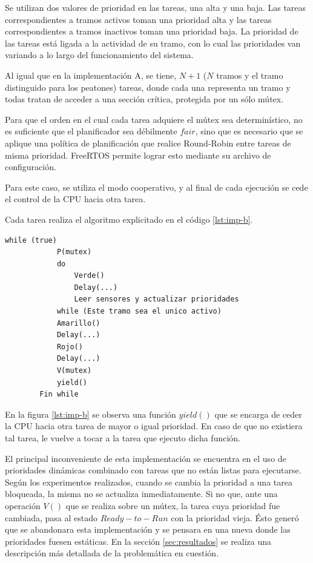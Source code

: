 	Se utilizan dos valores de prioridad en las tareas, una alta y una baja.
	Las tareas correspondientes a tramos activos toman una prioridad alta y las tareas correspondientes a tramos inactivos toman una prioridad baja. 
	La prioridad de las tareas está ligada a la actividad de su tramo, con lo cual las prioridades van variando a lo largo del funcionamiento del sistema.

	Al igual que en la implementación A, se tiene, $N + 1$ ($N$ tramos y el tramo distinguido para los peatones) tareas, donde cada una representa un tramo y todas tratan de acceder a una sección crítica, protegida por un sólo mútex.
	
	Para que el orden en el cual cada tarea adquiere el mútex sea determinístico, no es suficiente que el planificador sea débilmente $fair$, sino que es necesario que se aplique una política de planificación que realice Round-Robin entre tareas de misma prioridad.
	FreeRTOS permite lograr esto mediante su archivo de configuración.

	Para este caso, se utiliza el modo cooperativo, y al final de cada ejecución se cede el control de la CPU hacia otra tarea.

	Cada tarea realiza el algoritmo explicitado en el código \ref{lst:imp-b}.

	\begin{lstlisting}[label=lst:imp-b, caption=Pseudocódigo del programa que corre cada tarea en la implementación B.]
		while (true)
			P(mutex)
			do
				Verde()
				Delay(...)
				Leer sensores y actualizar prioridades
			while (Este tramo sea el unico activo)
			Amarillo()
			Delay(...)
			Rojo()
			Delay(...)
			V(mutex)
			yield()
		Fin while
	\end{lstlisting}

	En la figura \ref{lst:imp-b} se observa una función $yield( )$ que se encarga de ceder la CPU hacia otra tarea de mayor o igual prioridad.
	En caso de que no existiera tal tarea, le vuelve a tocar a la tarea que ejecuto dicha función.

	El principal inconveniente de esta implementación se encuentra en el uso de prioridades dinámicas combinado con tareas que no están listas para ejecutarse.
	Según los experimentos realizados, cuando se cambia la prioridad a una tarea bloqueada, la misma no se actualiza inmediatamente.
	Si no que, ante una operación $V( )$ que se realiza sobre un mútex, la tarea cuya prioridad fue cambiada, pasa al estado $Ready-to-Run$ con la prioridad vieja.
	Ésto generó que se abandonara esta implementación y se pensara en una nueva donde las prioridades fuesen estáticas.
	En la sección \ref{sec:resultados} se realiza una descripción más detallada de la problemática en cuestión.



